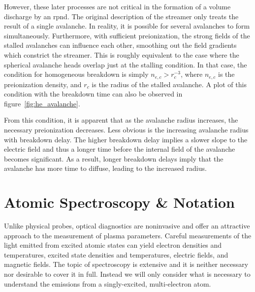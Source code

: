 {However, these later processes are not critical in the formation of a volume
discharge by an \acs{rpnd}. The original description of the streamer only treats
the result of a single avalanche. In reality, it is possible for several
avalanches to form simultaneously. Furthermore, with sufficient preionization,
the strong fields of the stalled avalanches can influence each other, smoothing
out the field gradients which constrict the streamer. This is roughly equivalent
to the case where the spherical avalanche heads overlap just at the stalling
condition. In that case, the condition for homogeneous breakdown is simply
$n_{e,c} > r_c^{-3}$, where $n_{e,c}$ is the preionization density, and $r_c$ is
the radius of the stalled avalanche. A plot of this condition with the breakdown
time can also be observed in figure~\ref{fig:he_avalanche}.

From this condition, it is apparent that as the avalanche radius increases, the
necessary preionization decreases. Less obvious is the increasing avalanche
radius with breakdown delay. The higher breakdown delay implies a slower slope
to the electric field and thus a longer time before the internal field of the
avalanche becomes significant. As a result, longer breakdown delays imply that
the avalanche has more time to diffuse, leading to the increased radius.

\section{Atomic Spectroscopy \& Notation}

Unlike physical probes, optical diagnostics are noninvasive and offer an
attractive approach to the measurement of plasma parameters. Careful
measurements of the light emitted from excited atomic states can yield electron
densities and temperatures, excited state densities and temperatures, electric
fields, and magnetic fields. The topic of spectroscopy is extensive and it is
neither necessary nor desirable to cover it in full. Instead we will only
consider what is necessary to understand the emissions from a singly-excited,
multi-electron atom.

}
